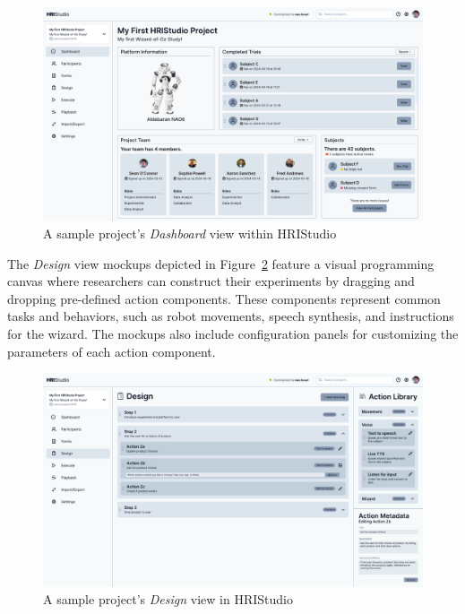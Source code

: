 \documentclass[letterpaper, 10 pt, conference]{ieeeconf}
\begin{document}
\begin{figure}[h]
    \begin{center}
        \includegraphics[width=0.4\paperwidth]{assets/mockups/dashboard}
        \vskip -0.3cm
        \caption{A sample project's \emph{Dashboard} view within HRIStudio}
        \label{fig:dashboard}
    \end{center}
    \vskip -0.4cm
\end{figure}

The \emph{Design} view mockups depicted in Figure~\ref{fig:design} feature a visual programming canvas where researchers can construct their experiments by dragging and dropping pre-defined action components. These components represent common tasks and behaviors, such as robot movements, speech synthesis, and instructions for the wizard. The mockups also include configuration panels for customizing the parameters of each action component.

\begin{figure}[h]
    \begin{center}
        \includegraphics[width=0.4\paperwidth]{assets/mockups/design}
         \vskip -0.3cm
        \caption{A sample project's \emph{Design} view in HRIStudio}
        \label{fig:design}
    \end{center}
    \vskip -0.5cm
\end{figure}
\end{document}
